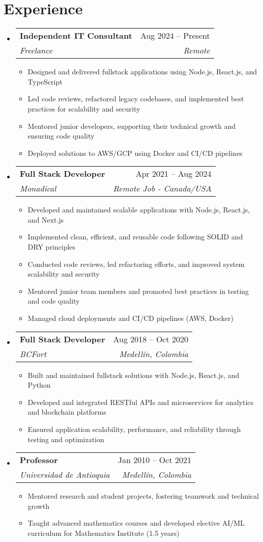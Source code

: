 \documentclass[letterpaper,11pt]{article}
\makeatletter
\newcommand{\resumeSubheading}[4]{
  \vspace{-2pt}
  \item[]
  \begin{tabular*}{\textwidth}{@{\extracolsep{\fill}}l r}
    \textbf{#1} & #2 \\
    \textit{#3} & \textit{#4} \\
  \end{tabular*}
  \vspace{-5pt}
}
\makeatother
\begin{document}
\section{Experience}
\begin{itemize}[leftmargin=0pt, itemindent=0pt, label={}]
\resumeSubheading
{Independent IT Consultant}{Aug 2024 -- Present}
{Freelance}{Remote}
\begin{itemize}[leftmargin=*]
    \item Designed and delivered fullstack applications using Node.js, React.js, and TypeScript
    \item Led code reviews, refactored legacy codebases, and implemented best practices for scalability and security
    \item Mentored junior developers, supporting their technical growth and ensuring code quality
    \item Deployed solutions to AWS/GCP using Docker and CI/CD pipelines
\end{itemize}

\resumeSubheading
{Full Stack Developer}{Apr 2021 -- Aug 2024}
{Monadical}{Remote Job - Canada/USA}
\begin{itemize}[leftmargin=*]
    \item Developed and maintained scalable applications with Node.js, React.js, and Next.js
    \item Implemented clean, efficient, and reusable code following SOLID and DRY principles
    \item Conducted code reviews, led refactoring efforts, and improved system scalability and security
    \item Mentored junior team members and promoted best practices in testing and code quality
    \item Managed cloud deployments and CI/CD pipelines (AWS, Docker)
\end{itemize}

\resumeSubheading
{Full Stack Developer}{Aug 2018 -- Oct 2020}
{BCFort}{Medellín, Colombia}
\begin{itemize}[leftmargin=*]
    \item Built and maintained fullstack solutions with Node.js, React.js, and Python
    \item Developed and integrated RESTful APIs and microservices for analytics and blockchain platforms
    \item Ensured application scalability, performance, and reliability through testing and optimization
\end{itemize}

\resumeSubheading
{Professor}{Jan 2010 -- Oct 2021}
{Universidad de Antioquia}{Medellín, Colombia}
\begin{itemize}[leftmargin=*]
    \item Mentored research and student projects, fostering teamwork and technical growth
    \item Taught advanced mathematics courses and developed elective AI/ML curriculum for Mathematics Institute (1.5 years)
\end{itemize}
\end{itemize}
\end{document}
